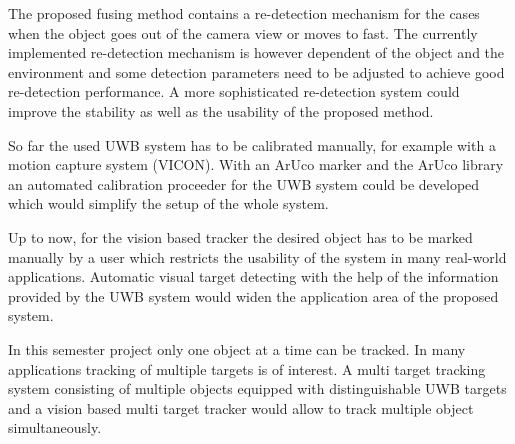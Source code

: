 The proposed fusing method contains a re-detection mechanism for the cases when the object goes out of the camera view or moves to fast. The currently implemented re-detection mechanism is however dependent of the object and the environment and some detection parameters need to be adjusted to achieve good re-detection performance. A more sophisticated re-detection system could improve the stability as well as the usability of the proposed method.

So far the used \ac{UWB} system has to be calibrated manually, for example with a motion capture system (VICON). With an ArUco marker and the ArUco library \cite{Aruco2014} an automated calibration proceeder for the \ac{UWB} system could be developed which would simplify the setup of the whole system. 

Up to now, for the vision based tracker the desired object has to be marked manually by a user which restricts the usability of the system in many real-world applications. Automatic visual target detecting with the help of the information provided by the \ac{UWB} system would widen the application area of the proposed system.

In this semester project only one object at a time can be tracked. In many applications tracking of multiple targets is of interest. A multi target tracking system consisting of multiple objects equipped with distinguishable \ac{UWB} targets and a vision based multi target tracker would allow to track multiple object simultaneously. 